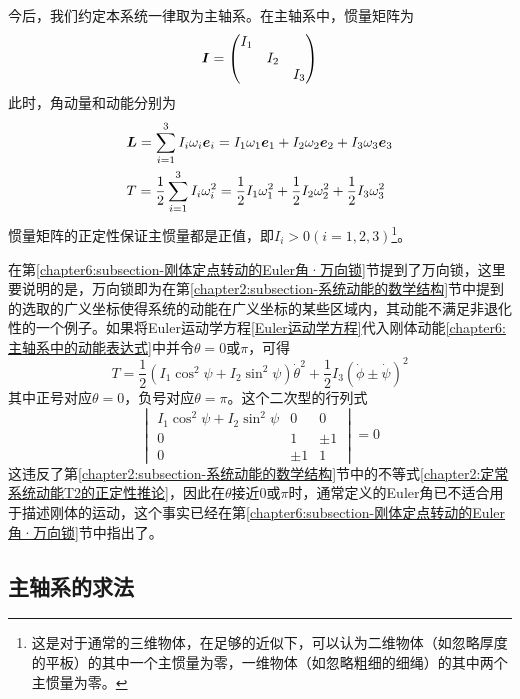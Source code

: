 今后，我们约定本系统一律取为主轴系。在主轴系中，惯量矩阵为
\begin{equation*}
	\boldsymbol{I} = \begin{pmatrix} I_1 & & \\ & I_2 & \\ & & I_3 \end{pmatrix}
\end{equation*}
此时，角动量和动能分别为
\begin{align}
	& \boldsymbol{L} = \sum_{i=1}^3 I_i \omega_i \boldsymbol{e}_i = I_1\omega_1\boldsymbol{e}_1+I_2\omega_2\boldsymbol{e}_2+I_3\omega_3\boldsymbol{e}_3 \label{chapter6:主轴系中的角动量表达式} \\
	& T = \frac12 \sum_{i=1}^3 I_i \omega_i^2 = \frac12 I_1\omega_1^2+\frac12 I_2\omega_2^2+\frac12 I_3\omega_3^2 \label{chapter6:主轴系中的动能表达式}
\end{align}
惯量矩阵的正定性保证主惯量都是正值，即$I_i>0(i=1,2,3)$\footnote{这是对于通常的三维物体，在足够的近似下，可以认为二维物体（如忽略厚度的平板）的其中一个主惯量为零，一维物体（如忽略粗细的细绳）的其中两个主惯量为零。}。

在第\ref{chapter6:subsection-刚体定点转动的Euler角·万向锁}节提到了万向锁，这里要说明的是，万向锁即为在第\ref{chapter2:subsection-系统动能的数学结构}节中提到的选取的广义坐标使得系统的动能在广义坐标的某些区域内，其动能不满足非退化性的一个例子。如果将Euler运动学方程\eqref{Euler运动学方程}代入刚体动能\eqref{chapter6:主轴系中的动能表达式}中并令$\theta=0\text{或}\pi$，可得
\begin{equation}
	T = \frac12 (I_1\cos^2\psi+I_2\sin^2\psi)\dot{\theta}^2 + \frac12 I_3(\dot{\phi}\pm \dot{\psi})^2
\end{equation}
其中正号对应$\theta=0$，负号对应$\theta=\pi$。这个二次型的行列式
\begin{equation*}
	\begin{vmatrix}
		I_1\cos^2\psi+I_2\sin^2\psi & 0 & 0 \\
		0 & 1 & \pm 1 \\
		0 & \pm 1 & 1 
	\end{vmatrix} = 0
\end{equation*}
这违反了第\ref{chapter2:subsection-系统动能的数学结构}节中的不等式\eqref{chapter2:定常系统动能T2的正定性推论}，因此在$\theta$接近$0$或$\pi$时，通常定义的Euler角已不适合用于描述刚体的运动，这个事实已经在第\ref{chapter6:subsection-刚体定点转动的Euler角·万向锁}节中指出了。

\subsection{主轴系的求法}

